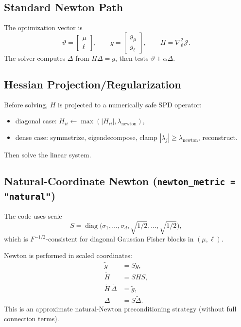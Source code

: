\documentclass[11pt]{article}
\begin{document}
\subsection{Standard Newton Path}
The optimization vector is
\begin{equation}
\vartheta=\begin{bmatrix}\mu\\\ell\end{bmatrix},\qquad
g=\begin{bmatrix}g_\mu\\g_\ell\end{bmatrix},\qquad
H=\nabla_\vartheta^2 \mathcal{J}.
\end{equation}
The solver computes \(\Delta\) from \(H\Delta=g\), then tests \(\vartheta+\alpha\Delta\).

\subsection{Hessian Projection/Regularization}
Before solving, \(H\) is projected to a numerically safe SPD operator:
\begin{itemize}
  \item diagonal case: \(H_{ii}\leftarrow \max(|H_{ii}|,\lambda_{\mathrm{newton}})\),
  \item dense case: symmetrize, eigendecompose, clamp \(|\lambda_j|\ge \lambda_{\mathrm{newton}}\), reconstruct.
\end{itemize}
Then solve the linear system.

\subsection{Natural-Coordinate Newton (\texttt{newton\_metric = "natural"})}
The code uses scale
\begin{equation}
S=\operatorname{diag}\!\big(\sigma_1,\dots,\sigma_d,\sqrt{1/2},\dots,\sqrt{1/2}\big),
\end{equation}
which is \(F^{-1/2}\)-consistent for diagonal Gaussian Fisher blocks in \((\mu,\ell)\).

Newton is performed in scaled coordinates:
\begin{align}
\tilde g &= S g,\\
\tilde H &= S H S,\\
\tilde H\,\tilde\Delta &= \tilde g,\\
\Delta &= S\tilde\Delta.
\end{align}
This is an approximate natural-Newton preconditioning strategy (without full connection terms).
\end{document}
